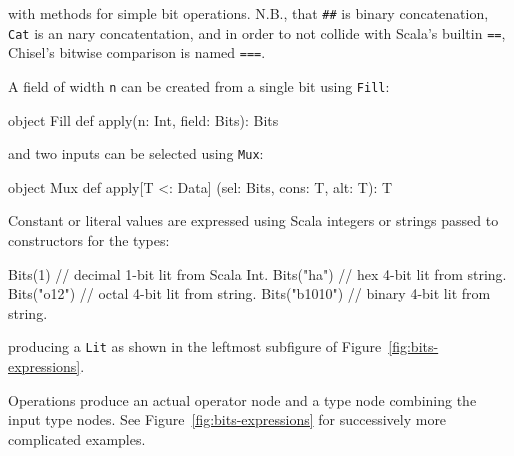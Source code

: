 \documentclass[10pt,twocolumn]{article}
\def\code#1{{\small\tt #1}}
\begin{document}
\noindent
with methods for simple bit operations.  
N.B., that \code{\#\#} is binary
concatenation, \code{Cat} is an nary concatentation,
and in order to not collide with Scala's builtin \code{==},
Chisel's bitwise comparison is named \code{===}.

A field of width \code{n} can be created from a single bit using \code{Fill}:
\begin{scala}
object Fill {
  def apply(n: Int, field: Bits): Bits
}
\end{scala}

\noindent
and two inputs can be selected using \code{Mux}:

\begin{scala}
object Mux {
  def apply[T <: Data]
    (sel: Bits, cons: T, alt: T): T
}
\end{scala}

\noindent

Constant or literal values are expressed using Scala integers or
strings passed to constructors for the types:
\begin{scala}
Bits(1)       // decimal 1-bit lit from Scala Int.
Bits("ha")    // hex 4-bit lit from string.
Bits("o12")   // octal 4-bit lit from string.
Bits("b1010") // binary 4-bit lit from string.
\end{scala}

\noindent
producing a \code{Lit} as shown in the
leftmost subfigure of Figure~\ref{fig:bits-expressions}.

Operations produce an actual operator node and a type node combining the input type nodes.
See Figure~\ref{fig:bits-expressions} for
successively more complicated examples.
\end{document}
